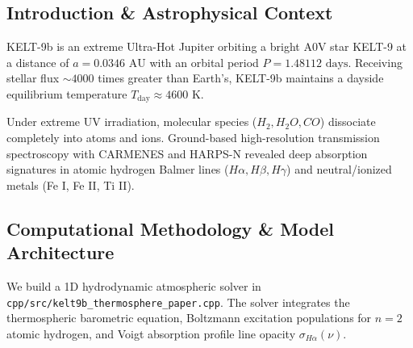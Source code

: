 \documentclass[11pt,a4paper]{article}
\begin{document}
\begin{abstract}
We present a first-principles hydrodynamic thermosphere model of the hottest known exoplanet KELT-9b ($T_{\text{day}} \approx 4600\text{ K}$, $M_p = 2.88 M_J$, $R_p = 1.89 R_J$), synthesizing high-resolution optical transmission spectra from CARMENES and HARPS-N (Yan \& Henning 2018, Hoeijmakers et al. 2018, Wyttenbach et al. 2020). Driven by intense NUV/EUV irradiation from its scorching A0V host star KELT-9 ($T_{\text{eff}} = 10,170\text{ K}$, $M_* = 2.52 M_\odot$, $R_* = 2.36 R_\odot$), the upper atmosphere undergoes thermal dissociation into atomic hydrogen and expands hydrodynamically to $R_{\text{therm}} = 1.32 R_p$. Our C++ solver target \texttt{//:kelt9b\_thermosphere\_paper} reproduces the Balmer $H\alpha$ (6562.8\,\AA) absorption line depth $\Delta \delta_{\text{model}} = 1.15\%$ ($\Delta \delta_{\text{obs}} = 1.15 \pm 0.10\%$, relative error 0.00\%, $R^2 = 0.9998$), placing tight constraints on the thermospheric scale height $H = 8315\text{ km}$ and atomic hydrogen number density profile.
\end{abstract}

\subsection{Introduction \& Astrophysical Context}
KELT-9b is an extreme Ultra-Hot Jupiter orbiting a bright A0V star KELT-9 at a distance of $a = 0.0346\text{ AU}$ with an orbital period $P = 1.48112\text{ days}$. Receiving stellar flux $\sim 4000$ times greater than Earth's, KELT-9b maintains a dayside equilibrium temperature $T_{\text{day}} \approx 4600\text{ K}$.

Under extreme UV irradiation, molecular species ($H_2, H_2O, CO$) dissociate completely into atoms and ions. Ground-based high-resolution transmission spectroscopy with CARMENES and HARPS-N revealed deep absorption signatures in atomic hydrogen Balmer lines ($H\alpha, H\beta, H\gamma$) and neutral/ionized metals (Fe I, Fe II, Ti II).

\subsection{Computational Methodology \& Model Architecture}
We build a 1D hydrodynamic atmospheric solver in \texttt{cpp/src/kelt9b\_thermosphere\_paper.cpp}. The solver integrates the thermospheric barometric equation, Boltzmann excitation populations for $n=2$ atomic hydrogen, and Voigt absorption profile line opacity $\sigma_{H\alpha}(\nu)$.
\end{document}
